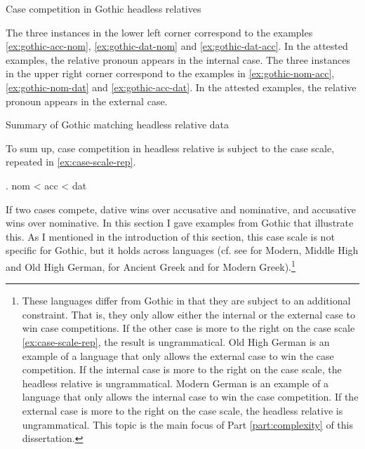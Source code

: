 \begin{table}[ht]
  \center
  \caption {Case competition in Gothic headless relatives}
    
    \label{tbl:summary-gothic}
\end{table}

The three instances in the lower left corner correspond to the examples \ref{ex:gothic-acc-nom}, \ref{ex:gothic-dat-nom} and \ref{ex:gothic-dat-acc}. In the attested examples, the relative pronoun appears in the internal case.
The three instances in the upper right corner correspond to the examples in \ref{ex:gothic-nom-acc}, \ref{ex:gothic-nom-dat} and \ref{ex:gothic-acc-dat}. In the attested examples, the relative pronoun appears in the external case.

\begin{table}[ht]
  \center
  \caption {Summary of Gothic matching headless relative data}
    
    \label{tbl:summary-gothic-1}
\end{table}

To sum up, case competition in headless relative is subject to the case scale, repeated in \ref{ex:case-scale-rep}.

\ex. \ac{nom} < \ac{acc} < \ac{dat}\label{ex:case-scale-rep}

If two cases compete, dative wins over accusative and nominative, and accusative wins over nominative. In this section I gave examples from Gothic that illustrate this. As I mentioned in the introduction of this section, this case scale is not specific for Gothic, but it holds across languages (cf. see \citealt{pittner1995} for Modern, Middle High and Old High German, \citealt{grosu2003} for Ancient Greek and \citealt{daskalaki2011} for Modern Greek).\footnote{
These languages differ from Gothic in that they are subject to an additional constraint. That is, they only allow either the internal or the external case to win case competitions. If the other case is more to the right on the case scale \ref{ex:case-scale-rep}, the result is ungrammatical.
Old High German is an example of a language that only allows the external case to win the case competition. If the internal case is more to the right on the case scale, the headless relative is ungrammatical. Modern German is an example of a language that only allows the internal case to win the case competition. If the external case is more to the right on the case scale, the headless relative is ungrammatical.
This topic is the main focus of Part \ref{part:complexity} of this dissertation.}


